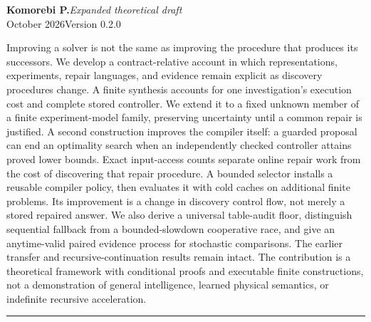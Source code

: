 \documentclass[11pt,letterpaper]{article}
\theoremstyle{plain}
\theoremstyle{definition}
\begin{document}
\hypersetup{pageanchor=false}
\begin{titlepage}\thispagestyle{empty}
\vspace*{.25in}
\par
\vspace{.65in}
\vspace{.19in}
\vspace{.27in}\noindent{\color{ink}\rule{\textwidth}{.85pt}}\par
\vspace{.16in}
\noindent\textbf{Komorebi P.}\hfill\textit{Expanded theoretical draft}\\
 October 2026\hfill Version 0.2.0\par
\vspace{.38in}
\par\smallskip
\noindent Improving a solver is not the same as improving the procedure that produces its successors. We develop a contract-relative account in which representations, experiments, repair languages, and evidence remain explicit as discovery procedures change. A finite synthesis accounts for one investigation's execution cost and complete stored controller. We extend it to a fixed unknown member of a finite experiment-model family, preserving uncertainty until a common repair is justified. A second construction improves the compiler itself: a guarded proposal can end an optimality search when an independently checked controller attains proved lower bounds. Exact input-access counts separate online repair work from the cost of discovering that repair procedure. A bounded selector installs a reusable compiler policy, then evaluates it with cold caches on additional finite problems. Its improvement is a change in discovery control flow, not merely a stored repaired answer. We also derive a universal table-audit floor, distinguish sequential fallback from a bounded-slowdown cooperative race, and give an anytime-valid paired evidence process for stochastic comparisons. The earlier transfer and recursive-continuation results remain intact. The contribution is a theoretical framework with conditional proofs and executable finite constructions, not a demonstration of general intelligence, learned physical semantics, or indefinite recursive acceleration.
\vfill\noindent\rule{\textwidth}{.4pt}\par\smallskip
{}
\end{titlepage}
\hypersetup{pageanchor=true}
\begingroup\small\setlength{\parskip}{0pt}\tableofcontents\endgroup\clearpage
\end{document}
